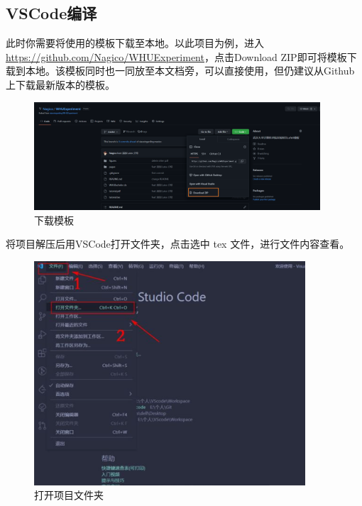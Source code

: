 \subsection{VSCode编译}

此时你需要将使用的模板下载至本地。以此项目为例，进入\url{https://github.com/Nagico/WHUExperiment}，点击Download ZIP即可将模板下载到本地。该模板同时也一同放至本文档旁，可以直接使用，但仍建议从Github上下载最新版本的模板。

\begin{figure}[htb]
  \centering
  \includegraphics[width=0.95\textwidth]{figures/chapter2/download-repo.png}
  \caption{下载模板}
  \label{fig:2-github-download-2}
\end{figure}

将项目解压后用VSCode打开文件夹，点击选中 tex 文件，进行文件内容查看。

\begin{figure}[H]
  \centering
  \includegraphics[width=0.9\textwidth]{figures/chapter2/vscode-open.png}
  \caption{打开项目文件夹}
  \label{fig:2-vscode-open-folder}
\end{figure}

